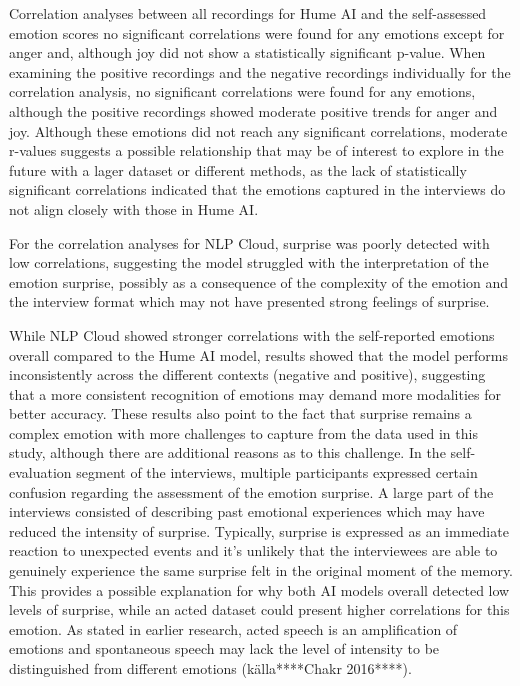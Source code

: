 Correlation analyses between all recordings for Hume AI and the self-assessed emotion scores no significant correlations were found for any emotions except for anger and, although joy did not show a statistically significant p-value. 
When examining the positive recordings and the negative recordings individually for the correlation analysis, no significant correlations were found for any emotions, although the positive recordings showed moderate positive trends for anger and joy. Although these emotions did not reach any significant correlations, moderate r-values suggests a possible relationship that may be of interest to explore in the future with a lager dataset or different methods, as the lack of statistically significant correlations indicated that the emotions captured in the interviews do not align closely with those in Hume AI. 

For the correlation analyses for NLP Cloud, surprise was poorly detected with low correlations, suggesting the model struggled with the interpretation of the emotion surprise, possibly as a consequence of the complexity of the emotion and the interview format which may not have presented strong feelings of surprise.

While NLP Cloud showed stronger correlations with the self-reported emotions overall compared to the Hume AI model, results showed that the model performs inconsistently across the different contexts (negative and positive), suggesting that a more consistent recognition of emotions may demand more modalities for better accuracy. These results also point to the fact that surprise remains a complex emotion with more challenges to capture from the data used in this study, although there are additional reasons as to this challenge. In the self-evaluation segment of the interviews, multiple participants expressed certain confusion regarding the assessment of the emotion surprise. A large part of the interviews consisted of describing past emotional experiences which may have reduced the intensity of surprise. Typically, surprise is expressed as an immediate reaction to unexpected events and it’s unlikely that the interviewees are able to genuinely experience the same surprise felt in the original moment of the memory. This provides a possible explanation for why both AI models overall detected low levels of surprise, while an acted dataset could present higher correlations for this emotion. As stated in earlier research, acted speech is an amplification of emotions and spontaneous speech may lack the level of intensity to be distinguished from different emotions (källa****Chakr 2016****).

